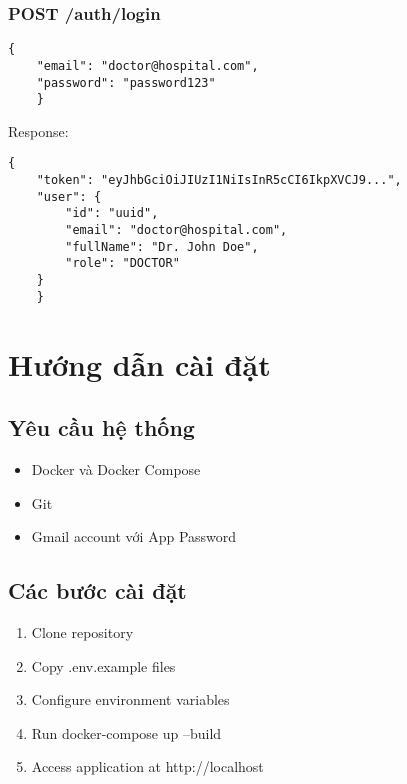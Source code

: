 \documentclass[12pt,a4paper]{report}
\begin{document}
    \subsection{POST /auth/login}
    \begin{lstlisting}[language=text]
    {
    "email": "doctor@hospital.com",
    "password": "password123"
    }
    \end{lstlisting}

    Response:
    \begin{lstlisting}[language=text]
    {
    "token": "eyJhbGciOiJIUzI1NiIsInR5cCI6IkpXVCJ9...",
    "user": {
        "id": "uuid",
        "email": "doctor@hospital.com",
        "fullName": "Dr. John Doe",
        "role": "DOCTOR"
    }
    }
    \end{lstlisting}

    \chapter{Hướng dẫn cài đặt}
    \section{Yêu cầu hệ thống}
    \begin{itemize}
        \item Docker và Docker Compose
        \item Git
        \item Gmail account với App Password
    \end{itemize}

    \section{Các bước cài đặt}
    \begin{enumerate}
        \item Clone repository
        \item Copy .env.example files
        \item Configure environment variables
        \item Run docker-compose up --build
        \item Access application at http://localhost
    \end{enumerate}

    
\end{document}
